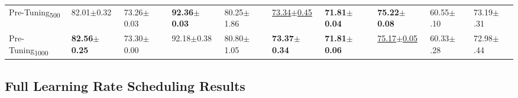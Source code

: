 \documentclass{article} %
\begin{document}
\begin{center}
\begin{sideways}
\begin{minipage}{0.9\textheight}
\begin{tabular}{llllllllll}
            Pre-Tuning\textsubscript{500}  & 82.01$\pm$0.32           & 73.26$\pm$0.03           & \bfseries 92.36$\pm$0.03 & 80.25$\pm$1.86             & \underline{73.34$\pm$0.45} & \bfseries 71.81$\pm$0.04 & \bfseries 75.22$\pm$0.08   & 60.55$\pm$.10            & 73.19$\pm$.31            \\
            Pre-Tuning\textsubscript{1000} & \bfseries 82.56$\pm$0.25 & 73.30$\pm$0.00           & 92.18$\pm$0.38           & 80.80$\pm$1.05             & \bfseries 73.37$\pm$0.34   & \bfseries 71.81$\pm$0.06 & \underline{75.17$\pm$0.05} & 60.33$\pm$.28            & 72.98$\pm$.44            \\
            \bottomrule
         \end{tabular}
      \end{minipage}
   \end{sideways}
\end{center}

\newpage
\subsection{Full Learning Rate Scheduling Results}\label{app:scheduling_results}

\vfill
\end{document}
